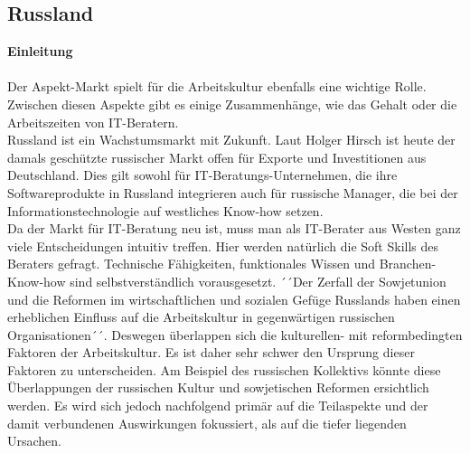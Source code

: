 	\subsection{Russland}	
	\textbf{Einleitung}\\ \\
	Der Aspekt-Markt spielt für die Arbeitskultur ebenfalls eine wichtige Rolle. Zwischen diesen Aspekte gibt es einige Zusammenhänge, wie das Gehalt oder die Arbeitszeiten von IT-Beratern.\\
	Russland ist ein Wachstumsmarkt mit Zukunft. Laut Holger Hirsch ist heute der damals geschützte russischer Markt offen für Exporte und Investitionen aus Deutschland. Dies gilt sowohl für IT-Beratungs-Unternehmen, die ihre Softwareprodukte in Russland integrieren auch für russische Manager, die bei der Informationstechnologie auf westliches Know-how setzen.\cite{ITConsRu}\\
	Da der Markt für IT-Beratung neu ist, muss man als IT-Berater aus Westen ganz viele Entscheidungen intuitiv treffen. Hier werden natürlich die Soft Skills des Beraters gefragt. Technische Fähigkeiten, funktionales Wissen und Branchen-Know-how sind selbstverständlich vorausgesetzt. ´´Der Zerfall der Sowjetunion und die Reformen im wirtschaftlichen und sozialen Gefüge Russlands haben einen erheblichen Einfluss auf die Arbeitskultur in gegenwärtigen russischen Organisationen´´\cite{ProzessbeglBerRU}.
	Deswegen überlappen sich die kulturellen- mit reformbedingten Faktoren der Arbeitskultur. Es ist daher sehr schwer den Ursprung dieser Faktoren zu unterscheiden. Am Beispiel des russischen Kollektivs könnte diese Überlappungen der russischen Kultur und sowjetischen Reformen ersichtlich werden. Es wird sich jedoch nachfolgend primär auf die Teilaspekte und der damit verbundenen Auswirkungen fokussiert, als auf die tiefer liegenden Ursachen.

